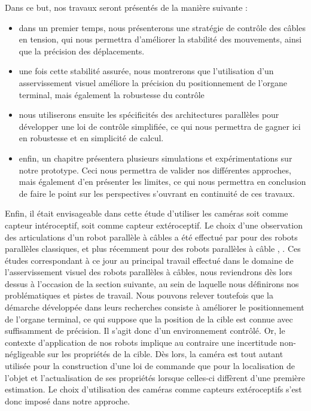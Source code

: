 Dans ce but, nos travaux seront pr\'esent\'es de la mani\`ere suivante : 
\begin{itemize}
 \item dans un premier temps, nous pr\'esenterons une strat\'egie de contr\^ole
des c\^ables en tension, qui nous permettra d'am\'eliorer la stabilit\'e des
mouvements, ainsi que la pr\'ecision des d\'eplacements.
 \item une fois cette stabilit\'e assur\'ee, nous montrerons que l'utilisation
d'un asservissement visuel am\'eliore la pr\'ecision du positionnement de
l'organe terminal, mais \'egalement la robustesse du contr\^ole
 \item nous utiliserons ensuite les sp\'ecificit\'es des architectures
parall\`eles pour d\'evelopper une loi de contr\^ole simplifi\'ee, ce qui nous
permettra de gagner ici en robustesse et en simplicit\'e de calcul.
 \item enfin, un chapitre pr\'esentera plusieurs simulations et
exp\'erimentations sur notre prototype. Ceci nous permettra de valider nos
diff\'erentes approches, mais \'egalement d'en pr\'esenter les limites, ce qui
nous permettra en conclusion de faire le point sur les perspectives s'ouvrant
en continuit\'e de ces travaux.
\end{itemize}


Enfin, il était envisageable dans cette étude d'utiliser les caméras soit comme 
capteur intéroceptif, soit comme capteur extéroceptif. Le choix d'une 
observation des articulations d'un robot parallèle à câbles a été effectué par 
\cite{andreff2007} pour des robots parallèles classiques, et plus récemment 
pour des robots parallèles à câble \cite{dallej2011}, \cite{dallej2012}. Ces 
études 
correspondant à ce jour au principal travail effectué dans le domaine de 
l'asservissement visuel des robots parallèles à câbles, nous reviendrons dès 
lors dessus à l'occasion de la section suivante, au sein de laquelle nous 
définirons nos problématiques et pistes de travail. Nous pouvons relever 
toutefois que la démarche développée dans leurs recherches consiste à améliorer 
le positionnement de l'organe terminal, ce qui suppose que la position de la 
cible est connue avec suffisamment de précision. Il s'agit donc d'un 
environnement contrôlé. Or, le contexte d'application de nos robots implique au 
contraire une incertitude non-négligeable sur les propriétés de la cible. Dès 
lors, la caméra est tout autant utilisée pour la construction d'une loi de 
commande que pour la localisation de l'objet et l'actualisation de ses 
propriétés lorsque celles-ci diffèrent d'une première estimation. Le choix 
d'utilisation des caméras comme capteurs extéroceptifs s'est donc imposé dans 
notre approche.






